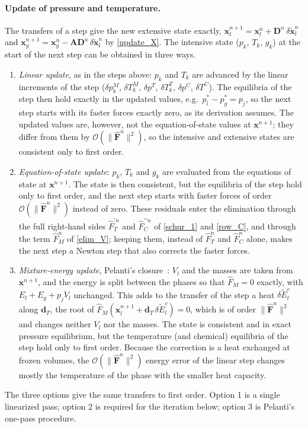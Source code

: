 \paragraph{Update of pressure and temperature.}
The transfers of a step give the new extensive state exactly, $\boldsymbol{x}_l^{n+1}=\boldsymbol{x}_l^n+\boldsymbol{D}^n\,\delta\tilde{\boldsymbol{x}}_l^n$ and $\boldsymbol{x}_g^{n+1}=\boldsymbol{x}_g^n-\boldsymbol{A}\boldsymbol{D}^n\,\delta\tilde{\boldsymbol{x}}_l^n$ by \eqref{update_X}. The intensive state ($p_k$, $T_k$, $g_k$) at the start of the next step can be obtained in three ways.
\begin{enumerate}
\item \emph{Linear update}, as in the steps above: $p_k$ and $T_k$ are advanced by the linear increments of the step ($\delta p_k^M$, $\delta T_k^M$, $\delta p^T$, $\delta T_k^T$, $\delta p^C$, $\delta T^C$). The equilibria of the step then hold exactly in the updated values, e.g.\ $p_l^*-p_g^*=p_{j}$, so the next step starts with its faster forces exactly zero, as its derivation assumes. The updated values are, however, not the equation-of-state values at $\boldsymbol{x}^{n+1}$; they differ from them by $\mathcal{O}(\lVert\hat{\boldsymbol{F}}^n\rVert^2)$, so the intensive and extensive states are consistent only to first order.
\item \emph{Equation-of-state update}: $p_k$, $T_k$ and $g_k$ are evaluated from the equations of state at $\boldsymbol{x}^{n+1}$. The state is then consistent, but the equilibria of the step hold only to first order, and the next step starts with faster forces of order $\mathcal{O}(\lVert\hat{\boldsymbol{F}}^n\rVert^2)$ instead of zero. These residuals enter the elimination through the full right-hand sides $\hat{F}^{\prime n}_T$ and $\hat{F}^{\prime\prime n}_C$ of \eqref{schur_1} and \eqref{row_C}, and through the term $\hat{F}_M^n$ of \eqref{elim_V}; keeping them, instead of $\hat{F}_T^n$ and $\hat{F}_C^n$ alone, makes the next step a Newton step that also corrects the faster forces.
\item \emph{Mixture-energy update}, Pelanti's closure~\cite[eqs.~(59), (70), (82)]{Pelanti2022}: $V_l$ and the masses are taken from $\boldsymbol{x}^{n+1}$, and the energy is split between the phases so that $\hat{F}_M=0$ exactly, with $E_l+E_g+p_{j}V_l$ unchanged. This adds to the transfer of the step a heat $\delta\tilde{E}_l^{c}$ along $\boldsymbol{d}_T$, the root of $\hat{F}_M(\boldsymbol{x}_l^{n+1}+\boldsymbol{d}_T\,\delta\tilde{E}_l^{c})=0$, which is of order $\lVert\hat{\boldsymbol{F}}^n\rVert^2$ and changes neither $V_l$ nor the masses. The state is consistent and in exact pressure equilibrium, but the temperature (and chemical) equilibria of the step hold only to first order. Because the correction is a heat exchanged at frozen volumes, the $\mathcal{O}(\lVert\hat{\boldsymbol{F}}^n\rVert^2)$ energy error of the linear step changes mostly the temperature of the phase with the smaller heat capacity.
\end{enumerate}
The three options give the same transfers to first order. Option 1 is a single linearized pass; option 2 is required for the iteration below; option 3 is Pelanti's one-pass procedure.

